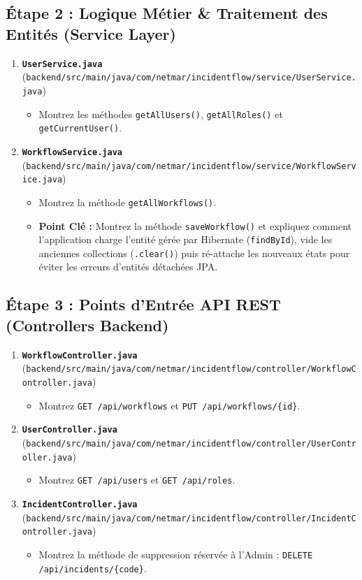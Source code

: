 \documentclass[11pt,a4paper]{article}
\begin{document}
\subsection{Étape 2 : Logique Métier \& Traitement des Entités (Service Layer)}
\begin{enumerate}
    \item \textbf{\texttt{UserService.java}} (\texttt{backend/src/main/java/com/netmar/incidentflow/service/UserService.java})
    \begin{itemize}
        \item Montrez les méthodes \texttt{getAllUsers()}, \texttt{getAllRoles()} et \texttt{getCurrentUser()}.
    \end{itemize}
    \item \textbf{\texttt{WorkflowService.java}} (\texttt{backend/src/main/java/com/netmar/incidentflow/service/WorkflowService.java})
    \begin{itemize}
        \item Montrez la méthode \texttt{getAllWorkflows()}.
        \item \textbf{Point Clé :} Montrez la méthode \texttt{saveWorkflow()} et expliquez comment l'application charge l'entité gérée par Hibernate (\texttt{findById}), vide les anciennes collections (\texttt{.clear()}) puis ré-attache les nouveaux états pour éviter les erreurs d'entités détachées JPA.
    \end{itemize}
\end{enumerate}

\subsection{Étape 3 : Points d'Entrée API REST (Controllers Backend)}
\begin{enumerate}
    \item \textbf{\texttt{WorkflowController.java}} (\texttt{backend/src/main/java/com/netmar/incidentflow/controller/WorkflowController.java})
    \begin{itemize}
        \item Montrez \texttt{GET /api/workflows} et \texttt{PUT /api/workflows/\{id\}}.
    \end{itemize}
    \item \textbf{\texttt{UserController.java}} (\texttt{backend/src/main/java/com/netmar/incidentflow/controller/UserController.java})
    \begin{itemize}
        \item Montrez \texttt{GET /api/users} et \texttt{GET /api/roles}.
    \end{itemize}
    \item \textbf{\texttt{IncidentController.java}} (\texttt{backend/src/main/java/com/netmar/incidentflow/controller/IncidentController.java})
    \begin{itemize}
        \item Montrez la méthode de suppression réservée à l'Admin : \texttt{DELETE /api/incidents/\{code\}}.
    \end{itemize}
\end{enumerate}
\end{document}
